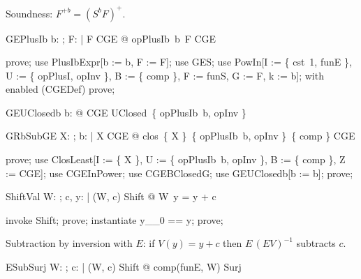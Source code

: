 \documentclass{article}
\begin{document}
Soundness: $F^{+b} = (S^b F)^+$.

\begin{theorem}{GEPlusIb}
  \forall b: \nat; F: \nat \fun \nat | F \in CGE @ opPlusIb~b~F \in CGE
\end{theorem}

\begin{zproof}
prove;
use PlusIbExpr[b := b, F := F];
use GES;
use PowIn[I := \{ cst~1, funE \}, U := \{ opPlusI, opInv \}, B := \{ comp \}, F := funS, G := F, k := b];
with enabled (CGEDef) prove;
\end{zproof}

\begin{theorem}{GEUClosedb}
  \forall b: \nat @ CGE \in UClosed~\{ opPlusIb~b, opInv \}
\end{theorem}


\begin{theorem}{GRbSubGE}
  \forall X: \nat \fun \nat; b: \nat | X \in CGE @ clos~\{ X \}~\{ opPlusIb~b, opInv \}~\{ comp \} \subseteq CGE
\end{theorem}

\begin{zproof}
prove;
use ClosLeast[I := \{ X \}, U := \{ opPlusIb~b, opInv \}, B := \{ comp \}, Z := CGE];
use CGEInPower;
use CGEBClosedG;
use GEUClosedb[b := b];
prove;
\end{zproof}

\begin{theorem}{ShiftVal}
  \forall W: \nat \fun \nat; c, y: \nat | (W, c) \in Shift @ W~y = y + c
\end{theorem}

\begin{zproof}
invoke Shift;
prove;
instantiate y\_\_0 == y;
prove;
\end{zproof}

Subtraction by inversion with $E$: if $V(y) = y + c$ then $E\,(E V)^{-1}$ subtracts $c$.

\begin{theorem}{ESubSurj}
  \forall W: \nat \fun \nat; c: \nat | (W, c) \in Shift @ comp(funE, W) \in Surj
\end{theorem}
\end{document}
